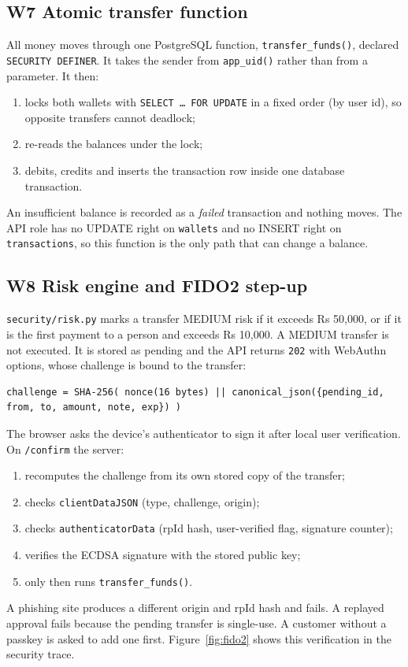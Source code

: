 \documentclass[11pt,a4paper]{article}
\newcommand{\code}[1]{\texttt{#1}}
\begin{document}
\subsection*{W7 Atomic transfer function}
All money moves through one PostgreSQL function, \code{transfer\_funds()}, declared \code{SECURITY DEFINER}. It takes the sender from \code{app\_uid()} rather than from a parameter. It then:
\begin{enumerate}
\item locks both wallets with \code{SELECT \ldots\ FOR UPDATE} in a fixed order (by user id), so opposite transfers cannot deadlock;
\item re-reads the balances under the lock;
\item debits, credits and inserts the transaction row inside one database transaction.
\end{enumerate}
An insufficient balance is recorded as a \emph{failed} transaction and nothing moves. The API role has no UPDATE right on \code{wallets} and no INSERT right on \code{transactions}, so this function is the only path that can change a balance.

\subsection*{W8 Risk engine and FIDO2 step-up}
\code{security/risk.py} marks a transfer MEDIUM risk if it exceeds Rs 50,000, or if it is the first payment to a person and exceeds Rs 10,000. A MEDIUM transfer is not executed. It is stored as pending and the API returns \code{202} with WebAuthn options, whose challenge is bound to the transfer:
\begin{lstlisting}
challenge = SHA-256( nonce(16 bytes) || canonical_json({pending_id, from, to, amount, note, exp}) )
\end{lstlisting}
The browser asks the device's authenticator to sign it after local user verification. On \code{/confirm} the server:
\begin{enumerate}
\item recomputes the challenge from its own stored copy of the transfer;
\item checks \code{clientDataJSON} (type, challenge, origin);
\item checks \code{authenticatorData} (rpId hash, user-verified flag, signature counter);
\item verifies the ECDSA signature with the stored public key;
\item only then runs \code{transfer\_funds()}.
\end{enumerate}
A phishing site produces a different origin and rpId hash and fails. A replayed approval fails because the pending transfer is single-use. A customer without a passkey is asked to add one first. Figure~\ref{fig:fido2} shows this verification in the security trace.
\end{document}
